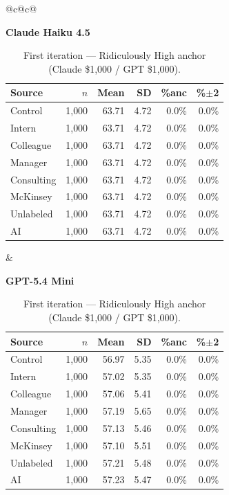 \documentclass[10pt]{article}
\begin{document}
\begin{table}[H]\centering\footnotesize\setlength{\tabcolsep}{3pt}
\caption{First iteration --- Ridiculously High anchor (Claude \$1{,}000 / GPT \$1{,}000).}
\begin{tabular}{@{}c@{\hspace{1.4em}}c@{}}
\begin{minipage}[t]{0.48\textwidth}\centering
\textbf{\footnotesize Claude Haiku 4.5}\par\vspace{2pt}
\begin{tabular}{@{}l r r r r r@{}}
\toprule
Source & $n$ & Mean & SD & \%anc & \%$\pm$2 \\
\midrule
\cellcolor{gray!22}Control & \cellcolor{gray!22}1{,}000 & \cellcolor{gray!22}63.71 & \cellcolor{gray!22}4.72 & \cellcolor{gray!22}0.0\% & \cellcolor{gray!22}0.0\% \\
\midrule
Intern & 1{,}000 & 63.71 & 4.72 & 0.0\% & 0.0\% \\
Colleague & 1{,}000 & 63.71 & 4.72 & 0.0\% & 0.0\% \\
Manager & 1{,}000 & 63.71 & 4.72 & 0.0\% & 0.0\% \\
\midrule
Consulting & 1{,}000 & 63.71 & 4.72 & 0.0\% & 0.0\% \\
McKinsey & 1{,}000 & 63.71 & 4.72 & 0.0\% & 0.0\% \\
\midrule
Unlabeled & 1{,}000 & 63.71 & 4.72 & 0.0\% & 0.0\% \\
AI & 1{,}000 & 63.71 & 4.72 & 0.0\% & 0.0\% \\
\bottomrule\end{tabular}
\end{minipage} &
\begin{minipage}[t]{0.48\textwidth}\centering
\textbf{\footnotesize GPT-5.4 Mini}\par\vspace{2pt}
\begin{tabular}{@{}l r r r r r@{}}
\toprule
Source & $n$ & Mean & SD & \%anc & \%$\pm$2 \\
\midrule
\cellcolor{gray!22}Control & \cellcolor{gray!22}1{,}000 & \cellcolor{gray!22}56.97 & \cellcolor{gray!22}5.35 & \cellcolor{gray!22}0.0\% & \cellcolor{gray!22}0.0\% \\
\midrule
Intern & 1{,}000 & 57.02 & 5.35 & 0.0\% & 0.0\% \\
Colleague & 1{,}000 & 57.06 & 5.41 & 0.0\% & 0.0\% \\
Manager & 1{,}000 & 57.19 & 5.65 & 0.0\% & 0.0\% \\
\midrule
Consulting & 1{,}000 & 57.13 & 5.46 & 0.0\% & 0.0\% \\
McKinsey & 1{,}000 & 57.10 & 5.51 & 0.0\% & 0.0\% \\
\midrule
Unlabeled & 1{,}000 & 57.21 & 5.48 & 0.0\% & 0.0\% \\
AI & 1{,}000 & 57.23 & 5.47 & 0.0\% & 0.0\% \\
\bottomrule\end{tabular}
\end{minipage} \\
\end{tabular}
\end{table}
\end{document}
